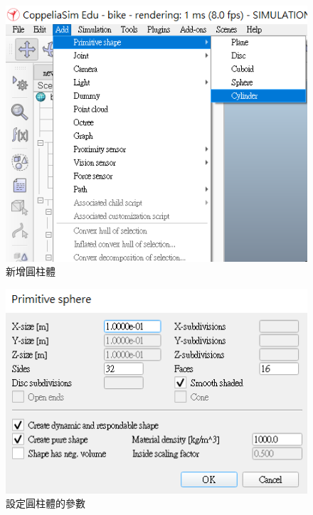 \documentclass[14pt,a4paper]{report}  %
\begin{document}
{{{\begin{itemize}
\begin{enumerate}
      \begin{figure}[hbt!]
        \centering
        \includegraphics[scale=0.6]{add_cylinder.png} 
        \caption{新增圓柱體}
        \label{fig_add_cylinder:scale}
      \end{figure}
      
      \begin{figure}[hbt!]
        \centering
        \includegraphics[scale=0.76]{cylinder_window.png} 
        \caption{設定圓柱體的參數}
        \label{fig_cylinder_window:scale}
      \end{figure}
      

\end{enumerate}
\end{itemize}}}}
\end{document}
